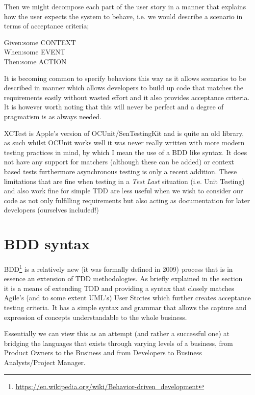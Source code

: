 \documentclass[a4paper, titlepage]{article}
\begin{document}
  Then we might decompose each part of the user story in a
  manner that explains how the user expects the system to behave, i.e. we
  would describe a scenario in terms of acceptance criteria;

  \begin{spec}{0.5}
    \ac{Given:}{some CONTEXT}\\
    \ac{When:}{some EVENT}\\
    \ac{Then:}{some ACTION}
  \end{spec}

  It is becoming common to specify behaviors this way as it allows
  scenarios to be described in manner which allows developers to build
  up code that matches the requirements easily without wasted effort and
  it also provides acceptance criteria. It is however worth noting that
  this will never be perfect and a degree of pragmatism is as always
  needed.
  
  XCTest is Apple's version of OCUnit/SenTestingKit and is quite an
  old library,
  as such whilst OCUnit works well it was never really written with more
  modern testing practices in mind, by which I mean the use of a BDD like syntax. It does
  not have any support for matchers (although these can be added) or context based tests furthermore
  asynchronous testing is only a recent addition. These 
  limitations that are fine when testing in a \textit{Test Last}
  situation (i.e. Unit Testing) and also work fine for simple
  TDD are less useful when we wish to consider our code as not only
  fulfilling requirements but also acting as documentation for later
  developers (ourselves included!)\\

\section{BDD syntax}
  BDD\footnote{\url{https://en.wikipedia.org/wiki/Behavior-driven_development}}
  is a relatively new (it was formally defined in 2009) process that is in
  essence an extension of TDD methodologies. As briefly explained in the
  section~ it is a means of extending TDD and
  providing a syntax that closely matches Agile's (and to some extent UML's) User
  Stories which further creates acceptance testing criteria. 
  It has a simple syntax and
  grammar that allows the capture and expression of concepts
  understandable to the whole business.

  Essentially we can view this as an attempt (and rather a successful
  one) at bridging the languages that exists through varying levels of
  a business, from Product Owners to the Business and from Developers to
  Business Analysts/Project Manager. 
  
\end{document}

